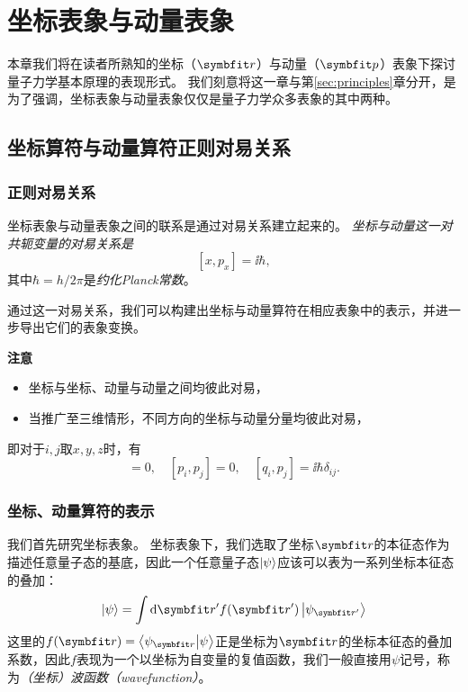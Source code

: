 
\section{坐标表象与动量表象}
\label{sec:coord_moment_rep}

本章我们将在读者所熟知的坐标（$\rr$）与动量（$\pp$）表象下探讨量子力学基本原理的表现形式。
我们刻意将这一章与第\ref{sec:principles}章分开，是为了强调，坐标表象与动量表象仅仅是量子力学众多表象的其中两种。

\subsection{\texorpdfstring{坐标算符与动量算符\quad 正则对易关系}{坐标算符与动量算符  正则对易关系}}
\label{subsec:cmr_operators}

\subsubsection{正则对易关系}

坐标表象与动量表象之间的联系是通过对易关系建立起来的。
\emph{坐标与动量这一对共轭变量的对易关系是}
\begin{equation}
    \label{eq:cmr_commutator}
    [x, p_x] = \ii\hbar,
\end{equation}
其中$\hbar=h/2\pi$是\emph{约化Planck常数}。

通过这一对易关系，我们可以构建出坐标与动量算符在相应表象中的表示，并进一步导出它们的表象变换。

\textbf{注意}
\begin{itemize}
    \item{坐标与坐标、动量与动量之间均彼此对易，}
    \item{当推广至三维情形，不同方向的坐标与动量分量均彼此对易，}
\end{itemize}
即对于$i,j$取$x,y,z$时，有
\begin{equation}
    [q_i, q_j]=0,\quad [p_i, p_j]=0,\quad [q_i,p_j]=\ii\hbar\delta_{ij}.
\end{equation}


\subsubsection{坐标、动量算符的表示}

我们首先研究坐标表象。
坐标表象下，我们选取了坐标$\rr$的本征态作为描述任意量子态的基底，因此一个任意量子态$\ket{\psi}$应该可以表为一系列坐标本征态的叠加：
\begin{equation}
    \ket{\psi} = \int \dd\rr' f(\rr') \ket{\psi_{\rr'}}
\end{equation}
这里的$f(\rr)=\braket{\psi_{\rr}}{\psi}$正是坐标为$\rr$的坐标本征态的叠加系数，因此$f$表现为一个以坐标为自变量的复值函数，我们一般直接用$\psi$记号，称为\emph{（坐标）波函数（wavefunction）}。

